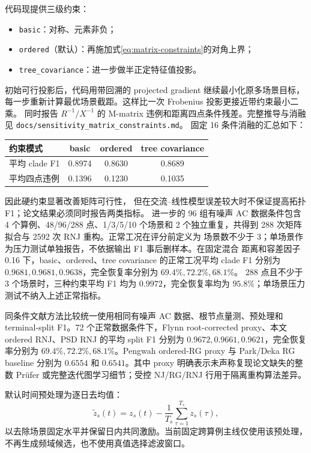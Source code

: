 代码现提供三级约束：
\begin{itemize}
  \item \texttt{basic}：对称、元素非负；
  \item \texttt{ordered}（默认）：再施加式\eqref{eq:matrix-constraints}的对角上界；
  \item \texttt{tree\_covariance}：进一步做半正定特征值投影。
\end{itemize}
初始可行投影后，代码用带回溯的 projected gradient 继续最小化原多场景目标，
每一步重新计算最优场景截距。这样比一次 Frobenius 投影更接近带约束最小二乘。
同时报告 $R^{-1}/X^{-1}$ 的 M-matrix 违例和距离四点条件残差。完整推导与消融见
\texttt{docs/sensitivity\_matrix\_constraints.md}。
固定 16 条件消融的汇总如下：
\begin{center}
\small
\begin{tabular}{lccc}
\toprule
约束模式 & basic & ordered & tree covariance \\
\midrule
平均 clade F1 & 0.8974 & 0.8630 & 0.8689 \\
平均四点违例 & 0.1396 & 0.1230 & 0.1035 \\
\bottomrule
\end{tabular}
\end{center}
因此硬约束显著改善矩阵可行性，
但在交流--线性模型误差较大时不保证提高拓扑 F1；论文结果必须同时报告两类指标。
进一步的 96 组有噪声 AC 数据条件包含 4 个算例、48/96/288 点、1/3/5/10 个场景和
2 个独立重复，共得到 288 次矩阵拟合与 2592 次 RNJ 重构。正常工况在评分前定义为
场景数不少于 3；单场景作为压力测试单独报告，不依据输出 F1 事后删样本。在固定混合
距离和容差因子 0.16 下，basic、ordered、tree covariance 的正常工况平均 clade F1
分别为 $0.9681,0.9681,0.9638$，完全恢复率分别为 $69.4\%,72.2\%,68.1\%$。
288 点且不少于 3 个场景时，三种约束平均 F1 均为 $0.9972$，完全恢复率均为
$95.8\%$；单场景压力测试不纳入上述正常指标。

同条件文献方法比较统一使用相同有噪声 AC 数据、根节点量测、预处理和 terminal-split
F1。72 个正常数据条件下，Flynn root-corrected proxy、本文 ordered RNJ、PSD RNJ
的平均 split F1 分别为 $0.9672,0.9661,0.9621$，完全恢复率分别为
$69.4\%,72.2\%,68.1\%$。Pengwah ordered-RG proxy 与 Park/Deka RG baseline
分别为 $0.6554$ 和 $0.6541$。其中 proxy 明确表示未声称复现论文缺失的整数
Prüfer 或完整迭代图学习细节；受控 NJ/RG/RNJ 行用于隔离重构算法差异。

默认时间预处理为逐日去均值：
\[
\widetilde z_s(t)=z_s(t)-\frac{1}{T_s}\sum_{\tau=1}^{T_s}z_s(\tau),
\]
以去除场景固定水平并保留日内共同激励。当前固定跨算例主线仅使用该预处理，
不再生成频域候选，也不使用真值选择滤波窗口。

